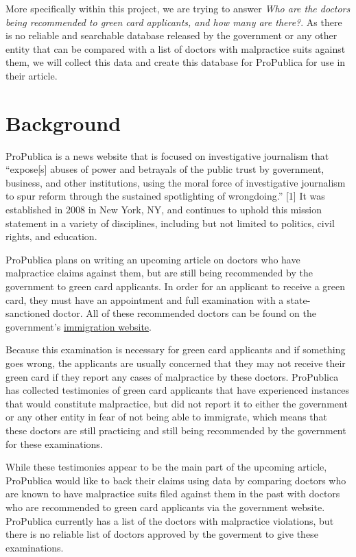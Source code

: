 \documentclass[10pt,letterpaper]{article}
\begin{document}
More specifically within this project, we are trying to answer \emph{Who
are the doctors being recommended to green card applicants, and how many
are there?}. As there is no reliable and searchable database released by
the government or any other entity that can be compared with a list of
doctors with malpractice suits against them, we will collect this data
and create this database for ProPublica for use in their article.

\section{Background}\label{background}

ProPublica is a news website that is focused on investigative journalism
that ``expose{[}s{]} abuses of power and betrayals of the public trust
by government, business, and other institutions, using the moral force
of investigative journalism to spur reform through the sustained
spotlighting of wrongdoing.'' {[}1{]} It was established in 2008 in New
York, NY, and continues to uphold this mission statement in a variety of
disciplines, including but not limited to politics, civil rights, and
education.

ProPublica plans on writing an upcoming article on doctors who have
malpractice claims against them, but are still being recommended by the
government to green card applicants. In order for an applicant to
receive a green card, they must have an appointment and full examination
with a state-sanctioned doctor. All of these recommended doctors can be
found on the government's \href{my.uscis.gov/findadoctor}{immigration
website}.

Because this examination is necessary for green card applicants and if
something goes wrong, the applicants are usually concerned that they may
not receive their green card if they report any cases of malpractice by
these doctors. ProPublica has collected testimonies of green card
applicants that have experienced instances that would constitute
malpractice, but did not report it to either the government or any other
entity in fear of not being able to immigrate, which means that these
doctors are still practicing and still being recommended by the
government for these examinations.

While these testimonies appear to be the main part of the upcoming
article, ProPublica would like to back their claims using data by
comparing doctors who are known to have malpractice suits filed against
them in the past with doctors who are recommended to green card
applicants via the government website. ProPublica currently has a list
of the doctors with malpractice violations, but there is no reliable
list of doctors approved by the goverment to give these examinations.
\end{document}
